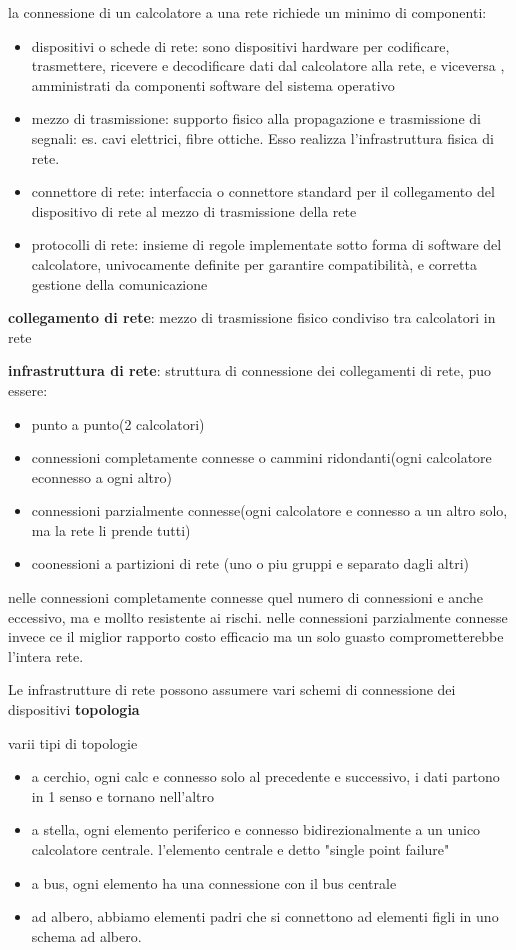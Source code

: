 \documentclass[12pt]{article}
\begin{document}
la connessione di un calcolatore a una rete richiede un minimo di componenti:
\begin{itemize}
\item dispositivi o schede di rete: sono dispositivi hardware per codificare, trasmettere, ricevere e decodificare
dati dal calcolatore alla rete, e viceversa
, amministrati da componenti software del sistema operativo
\item mezzo di trasmissione: supporto fisico alla propagazione e trasmissione di segnali: es. cavi elettrici,
fibre ottiche. Esso realizza l’infrastruttura fisica di rete.
\item connettore di rete: interfaccia o connettore standard per il collegamento del dispositivo di rete al mezzo
di trasmissione della rete
\item protocolli di rete: insieme di regole implementate sotto forma di software del calcolatore, univocamente
definite per garantire compatibilità, e corretta gestione della comunicazione
\end{itemize}

\textbf{collegamento di rete}: mezzo di trasmissione fisico condiviso tra calcolatori in rete

\textbf{infrastruttura di rete}: struttura di connessione dei collegamenti di rete, puo essere:
\begin{itemize}
\item punto a punto(2 calcolatori)
\item connessioni completamente connesse o cammini ridondanti(ogni calcolatore econnesso a ogni altro)
\item connessioni parzialmente connesse(ogni calcolatore e connesso a un altro solo, ma la rete li prende tutti)
\item coonessioni a partizioni di rete (uno o piu gruppi e separato dagli altri)
\end{itemize}

nelle connessioni completamente connesse quel numero di connessioni e anche eccessivo, ma e mollto resistente ai rischi.
nelle connessioni parzialmente connesse invece ce il miglior rapporto costo efficacio ma un solo guasto comprometterebbe l'intera rete.


Le infrastrutture di rete possono assumere vari schemi di connessione dei dispositivi \textbf{topologia}

varii tipi di topologie
\begin{itemize}
\item a cerchio, ogni calc  e connesso solo al precedente e successivo, i dati partono in 1 senso e tornano nell'altro
\item a stella, ogni elemento periferico e connesso bidirezionalmente a un unico calcolatore centrale. l'elemento centrale e detto "single point failure"
\item a bus, ogni elemento ha una connessione con il bus centrale
\item ad albero, abbiamo elementi padri che si connettono ad elementi figli in uno schema ad albero.
\end{itemize}
\end{document}
